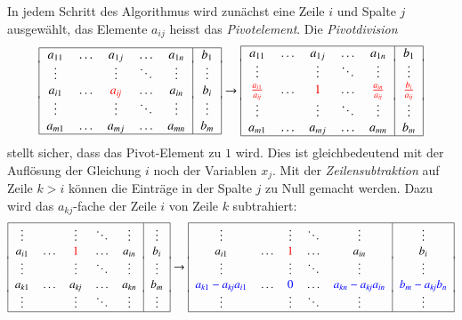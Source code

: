 In jedem Schritt des Algorithmus wird zunächst eine Zeile $i$ und
Spalte $j$ ausgewählt, das Elemente $a_{i\!j}$ heisst das {\em Pivotelement}.
%
Die {\em Pivotdivision}
\[
\begin{tabular}{|>{$}c<{$}>{$}c<{$}>{$}c<{$}>{$}c<{$}>{$}c<{$}|>{$}c<{$}|}
\hline
a_{11}&\dots &a_{1j}&\dots &a_{1n}&b_1   \\[-2pt]
\vdots&      &\vdots&\ddots&\vdots&\vdots\\
a_{i1}&\dots &{\color{red}a_{i\!j}}&\dots &a_{in}&b_i   \\[-2pt]
\vdots&      &\vdots&\ddots&\vdots&\vdots\\
a_{m1}&\dots &a_{mj}&\dots &a_{mn}&b_m   \\
\hline
\end{tabular}
\rightarrow
\begin{tabular}{|>{$}c<{$}>{$}c<{$}>{$}c<{$}>{$}c<{$}>{$}c<{$}|>{$}c<{$}|}
\hline
a_{11}&\dots &a_{1j}&\dots &a_{1n}&b_1   \\[-2pt]
\vdots&      &\vdots&\ddots&\vdots&\vdots\\
{\color{red}\frac{a_{i1}}{a_{i\!j}}}&\dots &{\color{red}1}&\dots &{\color{red}\frac{a_{in}}{a_{i\!j}}}&{\color{red}\frac{b_i}{a_{i\!j}}}\\[-2pt]
\vdots&      &\vdots&\ddots&\vdots&\vdots\\
a_{m1}&\dots &a_{mj}&\dots &a_{mn}&b_m   \\
\hline
\end{tabular}
\]
stellt sicher, dass das Pivot-Element zu $1$ wird.
Dies ist gleichbedeutend mit der Auflösung der Gleichung $i$ noch der
Variablen $x_j$.
Mit der {\em Zeilensubtraktion} auf Zeile $k>i$ können die Einträge in der
%
Spalte $j$ zu Null gemacht werden.
Dazu wird das $a_{k\!j}$-fache der Zeile $i$ von Zeile $k$ subtrahiert:
\[
\begin{tabular}{|>{$}c<{$}>{$}c<{$}>{$}c<{$}>{$}c<{$}>{$}c<{$}|>{$}c<{$}|}
\hline
\vdots&      &\vdots&\ddots&\vdots&\vdots\\
a_{i1}&\dots &{\color{red}1}&\dots &a_{in}&b_i   \\[-2pt]
\vdots&      &\vdots&\ddots&\vdots&\vdots\\
a_{k1}&\dots &a_{k\!j}&\dots &a_{kn}&b_m   \\[-2pt]
\vdots&      &\vdots&\ddots&\vdots&\vdots\\
\hline
\end{tabular}
\rightarrow
\begin{tabular}{|>{$}c<{$}>{$}c<{$}>{$}c<{$}>{$}c<{$}>{$}c<{$}|>{$}c<{$}|}
\hline
\vdots&      &\vdots&\ddots&\vdots&\vdots\\
a_{i1}&\dots &{\color{red}1}&\dots &a_{in}&b_i   \\[-2pt]
\vdots&      &\vdots&\ddots&\vdots&\vdots\\
{\color{blue}a_{k1}-a_{k\!j}a_{i1}}&\dots &{\color{blue}0}&\dots &{\color{blue}a_{kn}-a_{k\!j}a_{in}}&{\color{blue}b_m-a_{k\!j}b_{n}}\\[-2pt]
\vdots&      &\vdots&\ddots&\vdots&\vdots\\
\hline
\end{tabular}
\]
